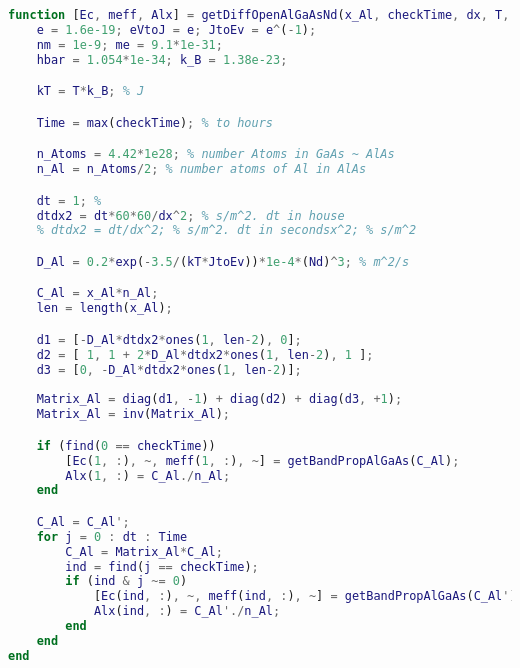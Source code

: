 \begin{lstlisting}[style=realcode,language=Matlab,caption={Функция расчета диффузии методом BTCS c учетом легирующей примеси},label={lst:DaNdDiff}]
function [Ec, meff, Alx] = getDiffOpenAlGaAsNd(x_Al, checkTime, dx, T, Nd)
	e = 1.6e-19; eVtoJ = e; JtoEv = e^(-1);
	nm = 1e-9; me = 9.1*1e-31;
	hbar = 1.054*1e-34; k_B = 1.38e-23;

	kT = T*k_B; % J

	Time = max(checkTime); % to hours

	n_Atoms = 4.42*1e28; % number Atoms in GaAs ~ AlAs
	n_Al = n_Atoms/2; % number atoms of Al in AlAs

	dt = 1; %
	dtdx2 = dt*60*60/dx^2; % s/m^2. dt in house
	% dtdx2 = dt/dx^2; % s/m^2. dt in secondsx^2; % s/m^2

	D_Al = 0.2*exp(-3.5/(kT*JtoEv))*1e-4*(Nd)^3; % m^2/s

	C_Al = x_Al*n_Al;
	len = length(x_Al);

	d1 = [-D_Al*dtdx2*ones(1, len-2), 0];
	d2 = [ 1, 1 + 2*D_Al*dtdx2*ones(1, len-2), 1 ];
	d3 = [0, -D_Al*dtdx2*ones(1, len-2)];
	
	Matrix_Al = diag(d1, -1) + diag(d2) + diag(d3, +1);
	Matrix_Al = inv(Matrix_Al);

	if (find(0 == checkTime))
		[Ec(1, :), ~, meff(1, :), ~] = getBandPropAlGaAs(C_Al);
		Alx(1, :) = C_Al./n_Al;		
	end

	C_Al = C_Al';
	for j = 0 : dt : Time
		C_Al = Matrix_Al*C_Al;
		ind = find(j == checkTime); 
		if (ind & j ~= 0)
			[Ec(ind, :), ~, meff(ind, :), ~] = getBandPropAlGaAs(C_Al');
			Alx(ind, :) = C_Al'./n_Al;
		end
	end
end
\end{lstlisting}